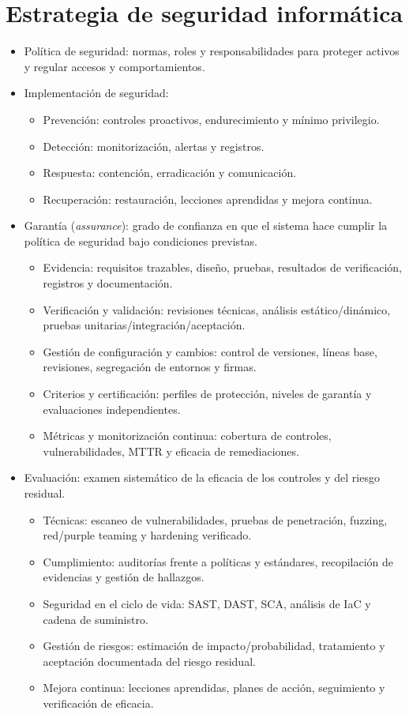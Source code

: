 \documentclass[11pt,a4paper]{article}
\begin{document}
    \section{Estrategia de seguridad informática}
    \begin{itemize}
        \item Política de seguridad: normas, roles y responsabilidades para proteger activos y regular accesos y comportamientos.
        \item Implementación de seguridad:
        \begin{itemize}
            \item Prevención: controles proactivos, endurecimiento y mínimo privilegio.
            \item Detección: monitorización, alertas y registros.
            \item Respuesta: contención, erradicación y comunicación.
            \item Recuperación: restauración, lecciones aprendidas y mejora continua.
        \end{itemize}
    \item Garantía (\textit{assurance}): grado de confianza en que el sistema hace cumplir la política de seguridad bajo condiciones previstas.
    \begin{itemize}
        \item Evidencia: requisitos trazables, diseño, pruebas, resultados de verificación, registros y documentación.
        \item Verificación y validación: revisiones técnicas, análisis estático/dinámico, pruebas unitarias/integración/aceptación.
        \item Gestión de configuración y cambios: control de versiones, líneas base, revisiones, segregación de entornos y firmas.
        \item Criterios y certificación: perfiles de protección, niveles de garantía y evaluaciones independientes.
        \item Métricas y monitorización continua: cobertura de controles, vulnerabilidades, MTTR y eficacia de remediaciones.
    \end{itemize}
    \item Evaluación: examen sistemático de la eficacia de los controles y del riesgo residual.
    \begin{itemize}
        \item Técnicas: escaneo de vulnerabilidades, pruebas de penetración, fuzzing, red/purple teaming y hardening verificado.
        \item Cumplimiento: auditorías frente a políticas y estándares, recopilación de evidencias y gestión de hallazgos.
        \item Seguridad en el ciclo de vida: SAST, DAST, SCA, análisis de IaC y cadena de suministro.
        \item Gestión de riesgos: estimación de impacto/probabilidad, tratamiento y aceptación documentada del riesgo residual.
        \item Mejora continua: lecciones aprendidas, planes de acción, seguimiento y verificación de eficacia.
    \end{itemize}
    \end{itemize}
\end{document}
